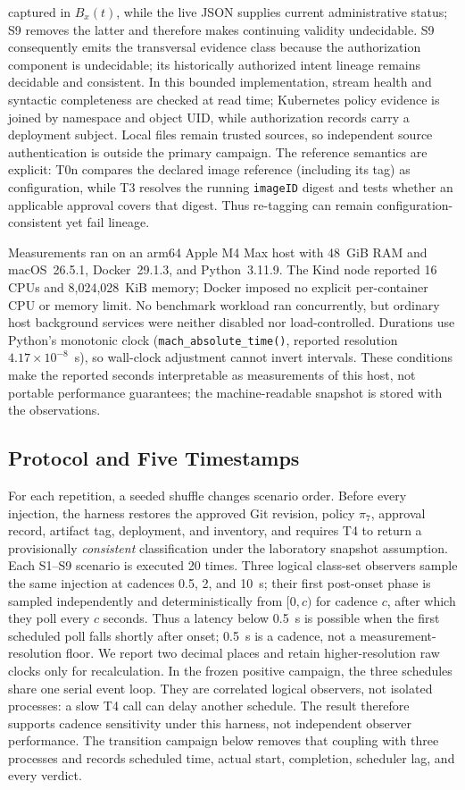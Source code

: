 captured in $B_x(t)$, while the live JSON supplies current administrative
status; S9 removes the latter and therefore makes continuing validity
undecidable. S9 consequently emits the transversal evidence class because the
authorization component is undecidable; its historically authorized intent
lineage remains decidable and consistent. In this bounded implementation,
stream health and syntactic
completeness are checked at read time; Kubernetes policy evidence is joined
by namespace and object UID, while authorization records carry a deployment
subject. Local files remain trusted sources, so independent source
authentication is outside the primary campaign. The reference semantics are explicit: T0n compares the declared image
reference (including its tag) as configuration, while T3 resolves the running
\texttt{imageID} digest and tests whether an applicable approval covers that
digest. Thus re-tagging can remain configuration-consistent yet fail lineage.

Measurements ran on an arm64 Apple M4 Max host with 48~GiB RAM and
macOS~26.5.1, Docker~29.1.3, and Python~3.11.9. The Kind node reported 16
CPUs and 8,024,028~KiB memory; Docker imposed no explicit per-container CPU
or memory limit. No benchmark workload ran concurrently, but ordinary host
background services were neither disabled nor load-controlled. Durations use
Python's monotonic clock (\texttt{mach\_absolute\_time()}, reported resolution
$4.17\times10^{-8}$~s), so wall-clock adjustment cannot invert intervals.
These conditions make the reported seconds interpretable as measurements of
this host, not portable performance guarantees; the machine-readable snapshot
is stored with the observations.

\subsection{Protocol and Five Timestamps}
For each repetition, a seeded shuffle changes scenario order. Before every
injection, the harness restores the approved Git revision, policy $\pi_7$,
approval record, artifact tag, deployment, and inventory, and requires T4 to
return a provisionally \emph{consistent} classification under the laboratory
snapshot assumption. Each S1--S9 scenario is executed 20 times. Three
logical class-set observers sample the same injection at cadences 0.5, 2, and 10~s;
their first post-onset phase is sampled independently and deterministically
from $[0,c)$ for cadence $c$, after which they poll every $c$ seconds. Thus a
latency below 0.5~s is possible when the first scheduled poll falls shortly
after onset; 0.5~s is a cadence, not a measurement-resolution floor. We
report two decimal places and retain higher-resolution raw clocks only for
recalculation. In the frozen positive campaign, the three schedules share one
serial event loop. They are correlated logical observers, not isolated
processes: a slow T4 call can delay another schedule. The result therefore
supports cadence sensitivity under this harness, not independent observer
performance. The transition campaign below removes that coupling with three
processes and records scheduled time, actual start, completion, scheduler lag,
and every verdict.

